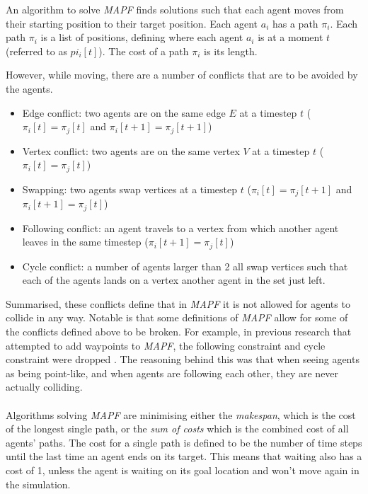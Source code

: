 \documentclass[english]{article}
\begin{document}
An algorithm to solve \textit{MAPF} finds solutions such that each agent moves from their starting position
to their target position. Each agent $a_i$ has a path $\pi_i$. Each path $\pi_i$ is a list of positions, defining where each agent $a_i$ is at a moment $t$ (referred to as $pi_i[t]$). The cost of a path $\pi_i$ is its length.

However, while moving, there are a number of conflicts that are to be avoided by the agents.

\begin{itemize}
    \item Edge conflict: two agents are on the same edge $E$ at a timestep $t$ ($\pi_i[t] = \pi_j[t]$ and $\pi_i[t+1] = \pi_j[t+1]$)
    \item Vertex conflict: two agents are on the same vertex $V$ at a timestep $t$ ($\pi_i[t] = \pi_j[t]$)
    \item Swapping: two agents swap vertices at a timestep $t$ ($\pi_i[t] = \pi_j[t+1]$ and $\pi_i[t+1] = \pi_j[t]$)
    \item Following conflict: an agent travels to a vertex from which another agent leaves in the same timestep ($\pi_i[t+1] = \pi_j[t]$)
    \item Cycle conflict: a number of agents larger than 2 all swap vertices such that each of the agents lands on a vertex another agent in the set just left.
\end{itemize}

Summarised, these conflicts define that in \textit{MAPF} it is not allowed for agents to collide in any way. Notable is that some definitions of \textit{MAPF} allow for some of the conflicts defined above to be broken. For example, in previous research that attempted to add waypoints to \textit{MAPF}, the following constraint and cycle constraint were dropped \cite{MSTAR_waypoints_van_dijk_2020}. The reasoning behind this was that when seeing agents as being point-like, and when agents are following each other, they are never actually colliding.

\paragraph{}

Algorithms solving \textit{MAPF} are minimising either the \textit{makespan}, which is the cost of the longest single path, or the \textit{sum of costs} which is the combined cost of all agents' paths. The cost for a single path is defined to be the number of time steps until the last time an agent ends on its target. This means that waiting also has a cost of 1, unless the agent is waiting on its goal location and won't move again in the simulation.
\end{document}
